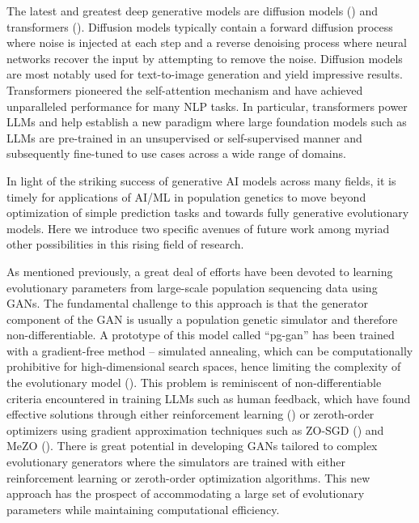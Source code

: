 The latest and greatest deep generative models are diffusion models (\cite{sohl2015deep}) and transformers (\cite{attention2017_3f5ee243}). Diffusion models typically contain a forward diffusion process where noise is injected at each step and a reverse denoising process where neural networks recover the input by attempting to remove the noise. Diffusion models are most notably used for text-to-image generation and yield impressive results. Transformers pioneered the self-attention mechanism and have achieved unparalleled performance for many \ac{NLP} tasks. In particular, transformers power \acfp{LLM} and help establish a new paradigm where large foundation models such as \acp{LLM} are pre-trained in an unsupervised or self-supervised manner and subsequently fine-tuned to use cases across a wide range of domains.

In light of the striking success of generative \ac{AI} models across many fields, it is timely for applications of \ac{AI}/\ac{ML} in population genetics to move beyond optimization of simple prediction tasks and towards fully generative evolutionary models. Here we introduce two specific avenues of future work among myriad other possibilities in this rising field of research.

As mentioned previously, a great deal of efforts have been devoted to learning evolutionary parameters from large-scale population sequencing data using \acp{GAN}. The fundamental challenge to this approach is that the generator component of the \ac{GAN} is usually a population genetic simulator and therefore non-differentiable. A prototype of this model called “pg-gan” has been trained with a gradient-free method – simulated annealing, which can be computationally prohibitive for high-dimensional search spaces, hence limiting the complexity of the evolutionary model (\cite{wang_automatic_2021}). This problem is reminiscent of non-differentiable criteria encountered in training \acp{LLM} such as human feedback, which have found effective solutions through either reinforcement learning (\cite{christiano2017deep,Hui_2021_CVPR}) or zeroth-order optimizers using gradient approximation techniques such as ZO-SGD (\cite{Spall1992}) and MeZO (\cite{malladi2023fine}). There is great potential in developing \acp{GAN} tailored to complex evolutionary generators where the simulators are trained with either reinforcement learning or zeroth-order optimization algorithms. This new approach has the prospect of accommodating a large set of evolutionary parameters while maintaining computational efficiency.


